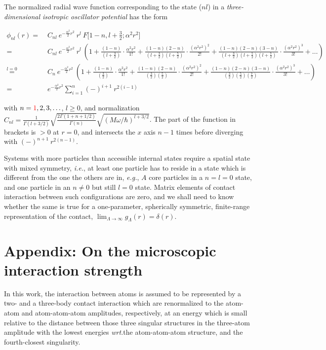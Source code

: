 \documentclass[onecolumn,preprint,superscriptaddress,nofootinbib,notitlepage,10pt,linenumbers]{revtex4-1}
\newcommand{\red}[1]{\textcolor{red}{#1}}
\newcommand{\eg}{\textit{e.g.}\;}
\newcommand{\ie}{\textit{i.e.}\;}
\newcommand{\wrt}{\textit{wrt.}\;}
\begin{document}
The normalized radial wave function corresponding to the state ($nl$) in a 
{\it three-dimensional isotropic oscillator potential} has the form
\begin{widetext}
\begin{align*}
\phi_{nl}(r)=&\;C_{nl}~e^{-\frac{\alpha^2}{2}r^2}~r^l~F\big[1-n,l+\frac{3}{2};\alpha^2r^2\big]\\
=&\;C_{nl}~e^{-\frac{\alpha^2}{2}r^2}~r^l~
\left(1+\frac{(1-n)}{(l+\frac{3}{2})}\cdot\frac{\alpha^2r^2}{1!}
+\frac{(1-n)(2-n)}{(l+\frac{3}{2})(l+\frac{5}{2})}\cdot\frac{(\alpha^2r^2)^2}{2!}
+\frac{(1-n)(2-n)(3-n)}{(l+\frac{3}{2})(l+\frac{5}{2})(l+\frac{7}{2})}\cdot\frac{(\alpha^2r^2)^3}{3!}+\ldots\right)\\
\stackrel{l=0}{=}&\;C_{n}~e^{-\frac{\alpha^2}{2}r^2}~
\left(1+\frac{(1-n)}{(\frac{3}{2})}\cdot\frac{\alpha^2r^2}{1!}
+\frac{(1-n)(2-n)}{(\frac{3}{2})(\frac{5}{2})}\cdot\frac{(\alpha^2r^2)^2}{2!}
+\frac{(1-n)(2-n)(3-n)}{(\frac{3}{2})(\frac{5}{2})(\frac{7}{2})}\cdot\frac{(\alpha^2r^2)^3}{3!}+\ldots\right)\\
=&\;e^{-\frac{\alpha^2}{2}r^2}\sum_{i=1}^n(-)^{i+1}~r^{2(i-1)}
\end{align*}
\end{widetext}
with $n=\red{1},2,3,\ldots$, $l\geq 0$, and normalization $C_{nl}=\frac{1}{\Gamma(l+3/2)}\sqrt{\frac{2\Gamma(1+n+1/2)}{\Gamma(n)}}\sqrt{(M\omega/\hbar)^{l+3/2}}$. The part of the function in brackets
is $>0$ at $r=0$, and intersects the $x$ axis $n-1$ times before diverging with $(-)^{n+1}~r^{2(n-1)}$.

Systems with more particles than accessible internal states require a spatial state with mixed symmetry, \ie, at least one
particle has to reside in a state which is different from the one the others are in, \eg, $A$ core particles in a
$n=l=0$ state, and one particle in an $n\neq0$ but still $l=0$ state. Matrix elements of contact interaction between
such configurations are zero, and we shall need to know whether the same is true for a one-parameter, spherically symmetric,
finite-range representation of the contact, $\lim_{\Lambda\to\infty}g_\Lambda(r)=\delta(r)$. 

\section{Appendix: On the microscopic interaction strength}
In this work, the interaction between atoms is assumed to be represented
by a two- and a three-body contact interaction which are renormalized
to the atom-atom and atom-atom-atom amplitudes, respectively, at
an energy which is small relative to the distance between those
three singular structures in the three-atom amplitude with the lowest
energies \wrt the atom-atom-atom structure, and the fourth-closest
singularity.
\end{document}
